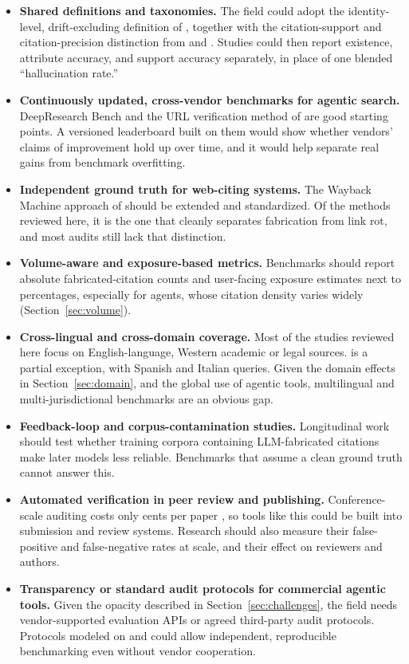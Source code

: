 \documentclass[acmsmall,screen]{acmart}
\begin{document}
\begin{itemize}
\item \textbf{Shared definitions and taxonomies.} The field could adopt the identity-level, drift-excluding definition of \citet{russinovich2026b}, together with the citation-support and citation-precision distinction from \citet{liu2023} and \citet{gao2023}. Studies could then report existence, attribute accuracy, and support accuracy separately, in place of one blended ``hallucination rate.''
\item \textbf{Continuously updated, cross-vendor benchmarks for agentic search.} DeepResearch Bench \citep{du2025} and the URL verification method of \citet{rao2026} are good starting points. A versioned leaderboard built on them would show whether vendors' claims of improvement hold up over time, and it would help separate real gains from benchmark overfitting.
\item \textbf{Independent ground truth for web-citing systems.} The Wayback Machine approach of \citet{rao2026} should be extended and standardized. Of the methods reviewed here, it is the one that cleanly separates fabrication from link rot, and most audits still lack that distinction.
\item \textbf{Volume-aware and exposure-based metrics.} Benchmarks should report absolute fabricated-citation counts and user-facing exposure estimates next to percentages, especially for agents, whose citation density varies widely (Section~\ref{sec:volume}).
\item \textbf{Cross-lingual and cross-domain coverage.} Most of the studies reviewed here focus on English-language, Western academic or legal sources. \citet{mcgowan2023} is a partial exception, with Spanish and Italian queries. Given the domain effects in Section~\ref{sec:domain}, and the global use of agentic tools, multilingual and multi-jurisdictional benchmarks are an obvious gap.
\item \textbf{Feedback-loop and corpus-contamination studies.} Longitudinal work should test whether training corpora containing LLM-fabricated citations \citep{zhao2026} make later models less reliable. Benchmarks that assume a clean ground truth cannot answer this.
\item \textbf{Automated verification in peer review and publishing.} Conference-scale auditing costs only cents per paper \citep{russinovich2026b}, so tools like this could be built into submission and review systems. Research should also measure their false-positive and false-negative rates at scale, and their effect on reviewers and authors.
\item \textbf{Transparency or standard audit protocols for commercial agentic tools.} Given the opacity described in Section~\ref{sec:challenges}, the field needs vendor-supported evaluation APIs or agreed third-party audit protocols. Protocols modeled on \citet{magesh2025} and \citet{rao2026} could allow independent, reproducible benchmarking even without vendor cooperation.
\end{itemize}
\end{document}
